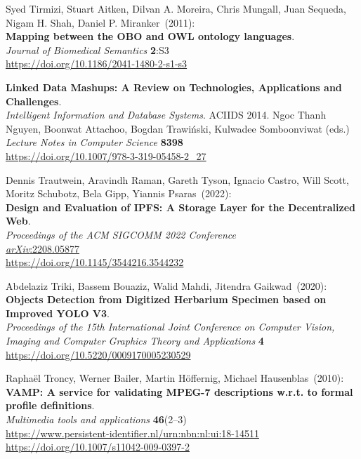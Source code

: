 \begin{thebibliography}{9}
Syed Tirmizi, Stuart Aitken, Dilvan A. Moreira, Chris Mungall, Juan Sequeda, Nigam H. Shah, Daniel P. Miranker~(2011): \\
\textbf{Mapping between the {OBO} and {OWL} ontology languages}. \\
\emph{Journal of Biomedical Semantics} \textbf{2}:S3 \\
\url{https://doi.org/10.1186/2041-1480-2-s1-s3}

\textbf{Linked Data Mashups: A Review on Technologies, Applications and Challenges}. \\
\emph{Intelligent Information and Database Systems}. ACIIDS 2014. Ngoc Thanh Nguyen, Boonwat Attachoo, Bogdan Trawiński, Kulwadee Somboonviwat (eds.)\\
\emph{Lecture Notes in Computer Science} \textbf{8398}\\
\url{https://doi.org/10.1007/978-3-319-05458-2_27}

Dennis Trautwein, Aravindh Raman, Gareth Tyson, Ignacio Castro, Will Scott, Moritz Schubotz, Bela Gipp, Yiannis Psaras~(2022): \\
\textbf{Design and Evaluation of IPFS: A Storage Layer for the Decentralized Web}.\\
\emph{Proceedings of the {ACM} {SIGCOMM} 2022 Conference}\\
\href{https://doi.org/10.48550/arXiv.2208.05877}{\emph{arXiv}:2208.05877}\\
\url{https://doi.org/10.1145/3544216.3544232}

Abdelaziz Triki, Bassem Bouaziz, Walid Mahdi, Jitendra Gaikwad~(2020): \\
\textbf{Objects Detection from Digitized Herbarium Specimen based on Improved YOLO V3}.\\
\emph{Proceedings of the 15th International Joint Conference on Computer Vision, Imaging and Computer Graphics Theory and Applications} 
\textbf{4}\\
\url{https://doi.org/10.5220/0009170005230529}

Raphaël Troncy, Werner Bailer, Martin Höffernig, Michael Hausenblas~(2010): \\
\textbf{VAMP: A service for validating MPEG-7 descriptions w.r.t. to formal profile definitions}.\\
\emph{Multimedia tools and applications} \textbf{46}(2--3) \\
\url{https://www.persistent-identifier.nl/urn:nbn:nl:ui:18-14511}\\
\url{https://doi.org/10.1007/s11042-009-0397-2}


\end{thebibliography}
